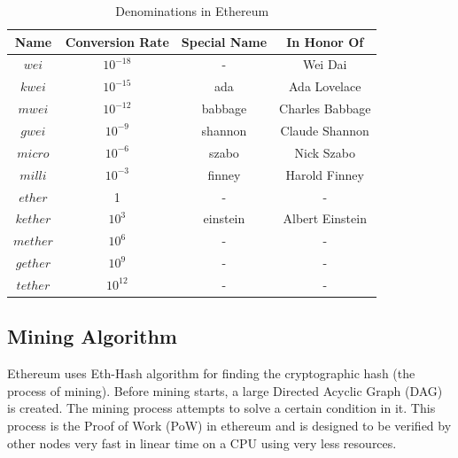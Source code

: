 \documentclass[11pt,openright]{report}
\begin{document}
\begin{table}[!htbp]
	\renewcommand{\arraystretch}{1.3}
	\caption{Denominations in Ethereum}
	\label{eth_denominations}
	\centering
	\begin{tabular}{|c||c|c|c|}
		\hline
		\bfseries Name & \bfseries Conversion Rate & \bfseries Special Name & \bfseries In Honor Of\\
		\hline\hline
		$wei$ & $10^{-18}$ & - & Wei Dai \\ \hline
	    $kwei$ & $10^{-15}$ & ada & Ada Lovelace \\ \hline
	    $mwei$ & $10^{-12}$ & babbage & Charles Babbage \\ \hline
	    $gwei$ & $10^{-9}$ & shannon & Claude Shannon \\ \hline
	    $micro$ & $10^{-6}$ & szabo & Nick Szabo \\ \hline
	    $milli$ & $10^{-3}$ & finney & Harold Finney \\ \hline
	    $ether$ & 1 & - & - \\ \hline
	    $kether$ & $10^{3}$ & einstein & Albert Einstein \\ \hline
	    $mether$ & $10^{6}$ & - & - \\ \hline
	    $gether$ & $10^{9}$ & - & - \\ \hline
	    $tether$ & $10^{12}$ & - & - \\ \hline

	\end{tabular}
\end{table}

\subsection{Mining Algorithm}
Ethereum uses Eth-Hash algorithm \cite{wood2014yellow} for finding the cryptographic hash (the process of mining). Before mining starts, a large Directed Acyclic Graph (DAG) is created. The mining process attempts to solve a certain condition in it. This process is the Proof of Work (PoW) in ethereum and is designed to be verified by other nodes very fast in linear time on a CPU using very less resources.
\end{document}
